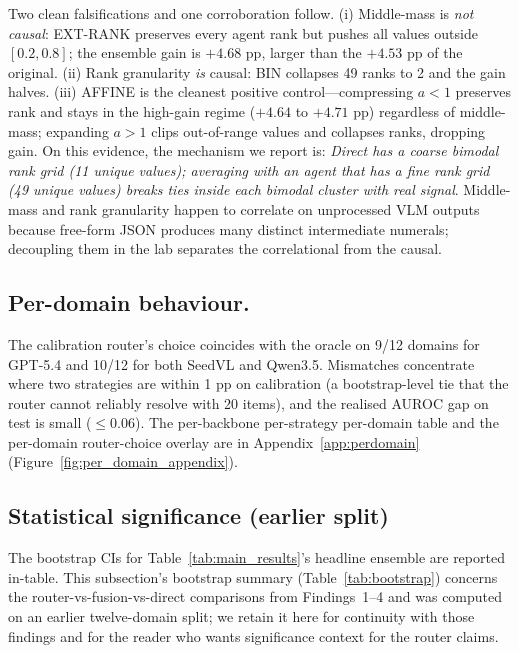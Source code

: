 Two clean falsifications and one corroboration follow. (i) Middle-mass is \emph{not causal}:  EXT-RANK preserves every agent rank but pushes all values outside $[0.2, 0.8]$; the ensemble gain is $+4.68$ pp, larger than the $+4.53$ pp of the original. (ii) Rank granularity \emph{is} causal: BIN collapses 49 ranks to 2 and the gain halves. (iii) AFFINE is the cleanest positive control---compressing $a<1$ preserves rank and stays in the high-gain regime ($+4.64$ to $+4.71$ pp) regardless of middle-mass; expanding $a>1$ clips out-of-range values and collapses ranks, dropping gain. On this evidence, the mechanism we report is: \emph{Direct has a coarse bimodal rank grid (11 unique values); averaging with an agent that has a fine rank grid (49 unique values) breaks ties inside each bimodal cluster with real signal}. Middle-mass and rank granularity happen to correlate on unprocessed VLM outputs because free-form JSON produces many distinct intermediate numerals; decoupling them in the lab separates the correlational from the causal.

\subsection{Per-domain behaviour.}
\label{ssec:perdomain_main}
The calibration router's choice coincides with the oracle on 9/12 domains for GPT-5.4 and 10/12 for both SeedVL and Qwen3.5. Mismatches concentrate where two strategies are within 1 pp on calibration (a bootstrap-level tie that the router cannot reliably resolve with 20 items), and the realised AUROC gap on test is small ($\le 0.06$). The per-backbone per-strategy per-domain table and the per-domain router-choice overlay are in Appendix~\ref{app:perdomain} (Figure~\ref{fig:per_domain_appendix}).

\subsection{Statistical significance (earlier split)}
\label{ssec:budget}

The bootstrap CIs for Table~\ref{tab:main_results}'s headline ensemble are reported in-table. This subsection's bootstrap summary (Table~\ref{tab:bootstrap}) concerns the router-vs-fusion-vs-direct comparisons from Findings~1--4 and was computed on an earlier twelve-domain split; we retain it here for continuity with those findings and for the reader who wants significance context for the router claims.

